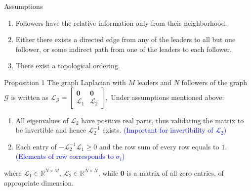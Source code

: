 \begin{frame}
	\vspace*{-0.3cm}
	\begin{block}{Assumptions}
		\begin{enumerate}
			\item Followers have the relative information only from their neighborhood.
			\item Either there exists a directed edge from any of the leaders to all but one follower, or some indirect path from one of the leaders to each follower. %
			\item There exist a topological ordering.
		\end{enumerate}
	\end{block}
	\vspace*{-0.2cm}
	\begin{block}{Proposition 1\footnotemark[1]}
		The graph Laplacian with $M$ leaders and $N$ followers of the graph $\mathcal{G}$ is written as %
		$
			\mathcal{L}_{\mathcal{G}}=
			\begin{bmatrix}
				\boldsymbol{0} & \boldsymbol{0}\\
				\mathcal{L}_{1} & \mathcal{L}_{2}
			\end{bmatrix},
		$
		Under assumptions mentioned above:
		\begin{enumerate}
			\item All eigenvalues of $\mathcal{L}_{2}$ have positive real parts, thus validating the matrix to be invertible and hence $\mathcal{L}_{2}^{-1}$ exists.\textcolor{blue}{ (Important for invertibility of $\mathcal{L}_{2}$)}
			\item Each entry of $-\mathcal{L}_{2}^{-1}\mathcal{L}_{1} \geq 0$ and the row sum of every row equals to $1$. \textcolor{blue}{(Elements of row corresponds to $\sigma_{i}$)}
		\end{enumerate}
		where $\mathcal{L}_{1} \in \mathbb{R}^{N \times M}$, $\mathcal{L}_{2} \in \mathbb{R}^{N \times N}$, while $\boldsymbol{0}$ is a matrix of all zero entries, of appropriate dimension.
	\end{block}
\end{frame}

